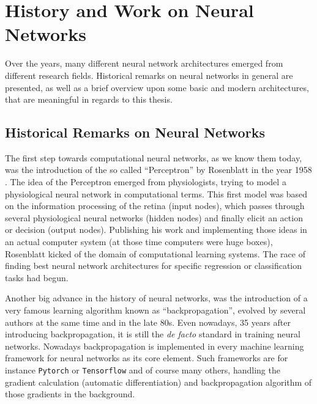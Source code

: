 
\section{History and Work on Neural Networks}\label{sec:prev_nn}
Over the years, many different neural network architectures emerged from different research fields.
Historical remarks on neural networks in general are presented, as well as a brief overview upon some basic and modern architectures, that are meaningful in regards to this thesis.



\subsection{Historical Remarks on Neural Networks}\label{sec:prev_nn_history}
The first step towards computational neural networks, as we know them today, was the introduction of the so called \enquote{Perceptron} by Rosenblatt in the year 1958 \cite{Rosenblatt1958}. 
The idea of the Perceptron emerged from physiologists, trying to model a physiological neural network in computational terms. 
This first model was based on the information processing of the retina (input nodes), which passes through several physiological neural networks (hidden nodes) and finally elicit an action or decision (output nodes).
Publishing his work and implementing those ideas in an actual computer system (at those time computers were huge boxes), Rosenblatt kicked of the domain of computational learning systems.
The race of finding best neural network architectures for specific regression or classification tasks had begun.

Another big advance in the history of neural networks, was the introduction of a very famous learning algorithm known as \enquote{backpropagation}, evolved by several authors at the same time \cite{LeCun1986} and \cite{Rumelhart1986} in the late 80s. 
Even nowadays, 35 years after introducing backpropagation, it is still the \emph{de facto} standard in training neural networks.
Nowadays backpropagation is implemented in every machine learning framework for neural networks as its core element.
Such frameworks are for instance \texttt{Pytorch} \cite{Pytorch} or \texttt{Tensorflow} \cite{Tensorflow} and of course many others, handling the gradient calculation (automatic differentiation) and backpropagation algorithm of those gradients in the background.

